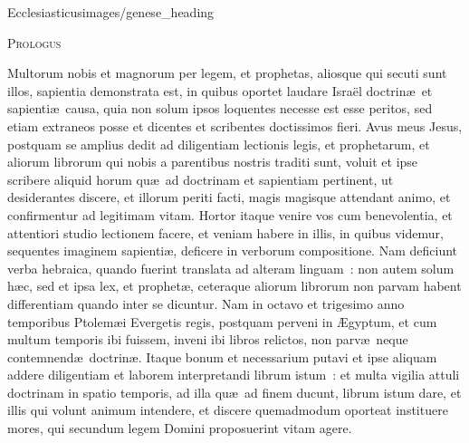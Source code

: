 {Ecclesiasticus}{images/genese_heading}

\begin{center}\textsc{Prologus}\end{center}\vspace{-6pt} Multorum nobis et magnorum per legem, et prophetas, aliosque qui secuti sunt illos, sapientia demonstrata est, in quibus oportet laudare Isra\"el doctrin\ae\ et sapienti\ae\ causa, quia non solum ipsos loquentes necesse est esse peritos, sed etiam extraneos posse et dicentes et scribentes doctissimos fieri. Avus meus Jesus, postquam se amplius dedit ad diligentiam lectionis legis, et prophetarum, et aliorum librorum qui nobis a parentibus nostris traditi sunt, voluit et ipse scribere aliquid horum qu\ae\ ad doctrinam et sapientiam pertinent, ut desiderantes discere, et illorum periti facti, magis magisque attendant animo, et confirmentur ad legitimam vitam. Hortor itaque venire vos cum benevolentia, et attentiori studio lectionem facere, et veniam habere in illis, in quibus videmur, sequentes imaginem sapienti\ae , deficere in verborum compositione. Nam deficiunt verba hebraica, quando fuerint translata ad alteram linguam~: non autem solum h\ae c, sed et ipsa lex, et prophet\ae , ceteraque aliorum librorum non parvam habent differentiam quando inter se dicuntur. Nam in octavo et trigesimo anno temporibus Ptolem\ae i Evergetis regis, postquam perveni in \AE gyptum, et cum multum temporis ibi fuissem, inveni ibi libros relictos, non parv\ae\ neque contemnend\ae\ doctrin\ae . Itaque bonum et necessarium putavi et ipse aliquam addere diligentiam et laborem interpretandi librum istum~: et multa vigilia attuli doctrinam in spatio temporis, ad illa qu\ae\ ad finem ducunt, librum istum dare, et illis qui volunt animum intendere, et discere quemadmodum oporteat instituere mores, qui secundum legem Domini proposuerint vitam agere. 

